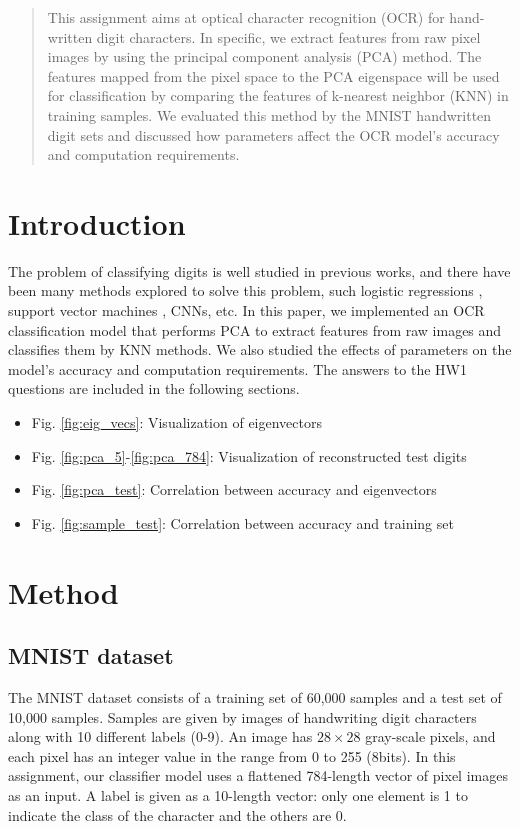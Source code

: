 \documentclass[conference]{IEEEtran}
\begin{document}
\IEEEpeerreviewmaketitle

\begin{abstract}
This assignment aims at optical character recognition (OCR) for hand-written digit characters. In specific, we extract features from raw pixel images by using the principal component analysis (PCA) method. The features mapped from the pixel space to the PCA eigenspace will be used for classification by comparing the features of k-nearest neighbor (KNN) in training samples. We evaluated this method by the MNIST handwritten digit sets and discussed how parameters affect the OCR model's accuracy and computation requirements.
\end{abstract}

\section{Introduction} %

The problem of classifying digits is well studied in previous works, and 
there have been many methods explored to solve this problem, such logistic regressions \cite{bishop1995neural}, support vector machines \cite{decoste2002training}, CNNs\cite{lecun1998gradient}, etc.
In this paper, we implemented an OCR classification model that performs PCA to extract features from raw images and classifies them by KNN methods. We also studied the effects of parameters on the model's accuracy and computation requirements. The answers to the HW1 questions are included in the following sections.\begin{itemize}
\item Fig. \ref{fig:eig_vecs}: Visualization of eigenvectors
\item Fig. \ref{fig:pca_5}-\ref{fig:pca_784}: Visualization of reconstructed test digits
\item Fig. \ref{fig:pca_test}: Correlation between accuracy and eigenvectors
\item Fig. \ref{fig:sample_test}: Correlation between accuracy and training set
\end{itemize}

\section{Method}
\label{sec:method}
\subsection{MNIST dataset} %
The MNIST dataset consists of a training set of 60,000 samples and a test set of 10,000 samples.
Samples are given by images of handwriting digit characters along with 10 different labels (0-9).
An image has $28 \times 28$ gray-scale pixels, and each pixel has an integer value in the range from 0 to 255 (8bits).
In this assignment, our classifier model uses a flattened 784-length vector of pixel images as an input.
A label is given as a 10-length vector: only one element is 1 to indicate the class of the character and the others are 0.
\end{document}
